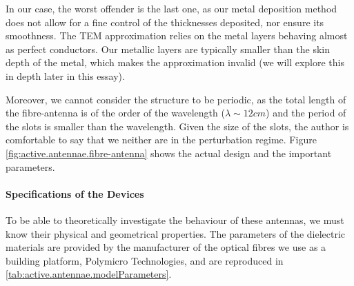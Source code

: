 In our case, the worst offender is the last one, as our metal deposition method
does not allow for a fine control of the thicknesses deposited, nor ensure its
smoothness. The TEM approximation relies on the metal layers behaving almost as 
perfect conductors. Our metallic layers are typically smaller than the skin
depth of the metal, which makes the approximation invalid (we will explore
this in depth later in this essay). 

Moreover, we cannot consider the structure to be periodic, as the total 
length of the fibre-antenna is of the order of the wavelength ($\lambda\sim12\unit{cm}$) and the period
of the slots is smaller than the wavelength. Given the size of the slots, 
the author is comfortable to say that we neither are in the perturbation regime. 
Figure \ref{fig:active.antennae.fibre-antenna} shows the actual design and the important parameters.

\paragraph{Specifications of the Devices}
To be able to theoretically investigate the behaviour of these antennas, we must
know their physical and geometrical properties. 
The parameters of the dielectric materials are provided by the manufacturer of the
optical fibres we use as a building platform,
Polymicro Technologies, and are reproduced in \ref{tab:active.antennae.modelParameters}.


